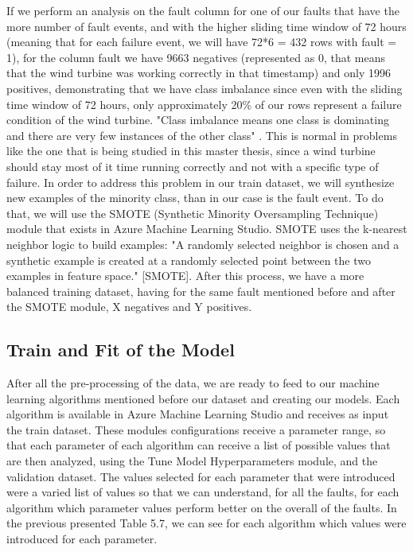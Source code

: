 If we perform an analysis on the fault column for one of our faults that have the more number of fault events, and with the higher sliding time window of 72 hours (meaning that for each failure event, we will have 72*6 = 432 rows with fault = 1), for the column fault we have 9663 negatives (represented as 0, that means that the wind turbine was working correctly in that timestamp) and only 1996 positives, demonstrating that we have class imbalance since even with the sliding time window of 72 hours, only approximately 20\% of our rows represent a failure condition of the wind turbine.
"Class imbalance means one class is dominating and there are very few instances of the other class" \cite{ML_Data_processing}. This is normal in problems like the one that is being studied in this master thesis, since a wind turbine should stay most of it time running correctly and not with a specific type of failure.
In order to address this problem in our train dataset, we will synthesize new examples of the minority class, than in our case is the fault event. To do that, we will use the SMOTE (Synthetic Minority Oversampling Technique) module that exists in Azure Machine Learning Studio. SMOTE uses the k-nearest neighbor logic to build examples: "A randomly selected neighbor is chosen and a synthetic example is created at a randomly selected point between the two examples in feature space." [SMOTE].
After this process, we have a more balanced training dataset, having for the same fault mentioned before and after the SMOTE module, X negatives and Y positives.



\subsection{Train and Fit of the Model}
After all the pre-processing of the data, we are ready to feed to our machine learning algorithms mentioned before our dataset and creating our models. Each algorithm is available in Azure Machine Learning Studio and receives as input the train dataset. These modules configurations receive a parameter range, so that each parameter of each algorithm can receive a list of possible values that are then analyzed, using the Tune Model Hyperparameters module, and the validation dataset. 
The values selected for each parameter that were introduced were a varied list of values so that we can understand, for all the faults, for each algorithm which parameter values perform better on the overall of the faults.
In the previous presented Table 5.7, we can see for each algorithm which values were introduced for each parameter.

